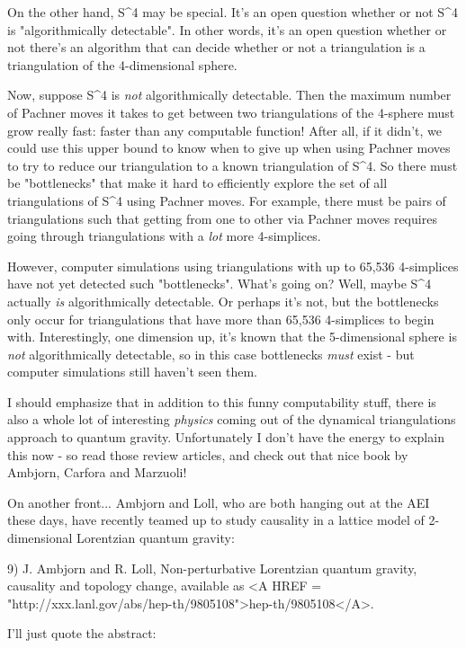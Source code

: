 On the other hand, S^{4} may be special.  It's an open question whether or
not S^{4} is "algorithmically detectable".  In other words, it's an open
question whether or not there's an algorithm that can decide whether or
not a triangulation is a triangulation of the 4-dimensional sphere.  

Now, suppose S^{4} is \emph{not} algorithmically detectable.  Then the maximum
number of Pachner moves it takes to get between two triangulations of 
the 4-sphere must grow really fast: faster than any computable function!
After all, if it didn't, we could use this upper bound to know when to
give up when using Pachner moves to try to reduce our triangulation
to a known triangulation of S^{4}.  So there must be "bottlenecks" that 
make it hard to efficiently explore the set of all triangulations of S^{4} 
using Pachner moves.  For example, there must be pairs of triangulations 
such that getting from one to other via Pachner moves requires going through 
triangulations with a \emph{lot} more 4-simplices.  

However, computer simulations using triangulations with up to 65,536
4-simplices have not yet detected such "bottlenecks".  What's going on?  
Well, maybe S^{4} actually \emph{is} algorithmically detectable.  Or perhaps
it's not, but the bottlenecks only occur for triangulations that have 
more than 65,536 4-simplices to begin with.  Interestingly, one dimension 
up, it's known that the 5-dimensional sphere is \emph{not} algorithmically 
detectable, so in this case bottlenecks \emph{must} exist - but computer 
simulations still haven't seen them.  

I should emphasize that in addition to this funny computability stuff,
there is also a whole lot of interesting \emph{physics} coming out of the
dynamical triangulations approach to quantum gravity.  Unfortunately
I don't have the energy to explain this now - so read those review
articles, and check out that nice book by Ambjorn, Carfora and Marzuoli!

On another front... Ambjorn and Loll, who are both hanging out at the 
AEI these days, have recently teamed up to study causality in a lattice 
model of 2-dimensional Lorentzian quantum gravity:

9) J. Ambjorn and R. Loll, Non-perturbative Lorentzian quantum
gravity, causality and topology change, available as
<A HREF = "http://xxx.lanl.gov/abs/hep-th/9805108">hep-th/9805108</A>.

I'll just quote the abstract:

